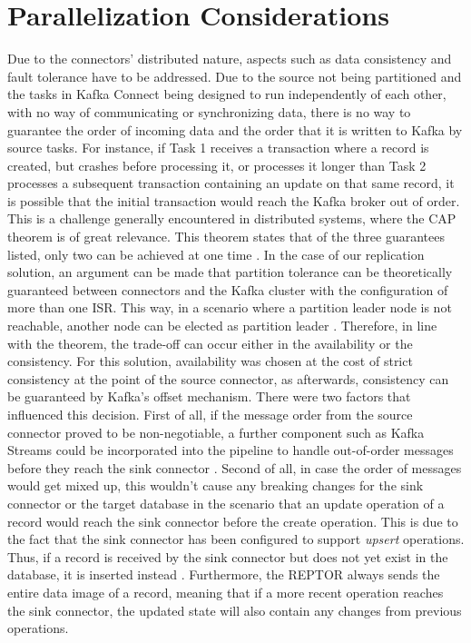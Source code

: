 \section{Parallelization Considerations}
\label{ch04:pipelinedevelopment:parallelizationconsiderations}
Due to the connectors' distributed nature, aspects such as data consistency and fault tolerance have to be addressed. Due to the source not being partitioned and the tasks in Kafka Connect being designed to run independently of each other, with no way of communicating or synchronizing data, there is no way to guarantee the order of incoming data and the order that it is written to Kafka by source tasks. For instance, if Task 1 receives a transaction where a record is created, but crashes before processing it, or processes it longer than Task 2 processes a subsequent transaction containing an update on that same record, it is possible that the initial transaction would reach the Kafka broker out of order. This is a challenge generally encountered in distributed systems, where the \ac{CAP} theorem is of great relevance. This theorem states that of the three guarantees listed, only two can be achieved at one time \cite{nookala2022distributedshift}. In the case of our replication solution, an argument can be made that partition tolerance can be theoretically guaranteed between connectors and the Kafka cluster with the configuration of more than one \ac{ISR}. This way, in a scenario where a partition leader node is not reachable, another node can be elected as partition leader \cite{optimizingkafkacap}. Therefore, in line with the theorem, the trade-off can occur either in the availability or the consistency. For this solution, availability was chosen at the cost of strict consistency at the point of the source connector, as afterwards, consistency can be guaranteed by Kafka's offset mechanism. There were two factors that influenced this decision. First of all, if the message order from the source connector proved to be non-negotiable, a further component such as Kafka Streams could be incorporated into the pipeline to handle out-of-order messages before they reach the sink connector \cite{wang2021consistency}. Second of all, in case the order of messages would get mixed up, this wouldn't cause any breaking changes for the sink connector or the target database in the scenario that an update operation of a record would reach the sink connector before the create operation. This is due to the fact that the sink connector has been configured to support \textit{upsert} operations. Thus, if a record is received by the sink connector but does not yet exist in the database, it is inserted instead \cite{jdbcsinkdocumentation}. Furthermore, the \ac{REPTOR} always sends the entire data image of a record, meaning that if a more recent operation reaches the sink connector, the updated state will also contain any changes from previous operations.

